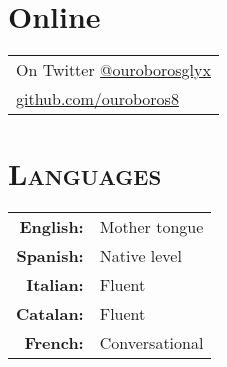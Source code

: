 \documentclass[a4paper,10pt]{article} %
\newcommand*{\justifyheading}{\raggedright}
\begin{document}
\medskip

\begin{minipage}[t]{0.75\textwidth}
\section{Online}
\smallskip
\begin{tabular}{l}
On Twitter \href{https://twitter.com/ouroborosglyx}{@ouroborosglyx}\\
\href{https://github.com/ouroboros8}{github.com/ouroboros8}
\end{tabular}
\end{minipage}\hspace{-0.01\textwidth}
%
%
\begin{minipage}[t]{0.25\textwidth}
\renewcommand{\justifyheading}{\raggedleft}
\section{\textsc{Languages}}
\smallskip
\begin{tabular}{rl}
 \textbf{English:} & Mother tongue  \\

 \textbf{Spanish:} & Native level  \\

 \textbf{Italian:} & Fluent  \\

 \textbf{Catalan:} & Fluent  \\

 \textbf{French:}  & Conversational
\end{tabular}
\end{minipage}
\end{document}
